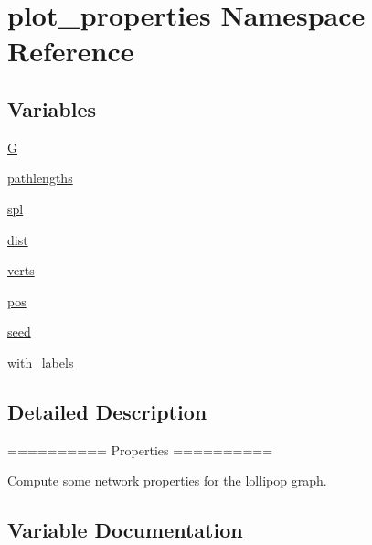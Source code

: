\hypertarget{namespaceplot__properties}{}\section{plot\+\_\+properties Namespace Reference}
\label{namespaceplot__properties}
\subsection*{Variables}
\begin{DoxyCompactItemize}
\item 
\hyperlink{namespaceplot__properties_aa256caf2d44a0c0359cd726ec541198d}{G}
\item 
\hyperlink{namespaceplot__properties_a38087a53babc65e2d5bd6f95163c136a}{pathlengths}
\item 
\hyperlink{namespaceplot__properties_a8c0a474ab2e046e3a80293bdc532b27b}{spl}
\item 
\hyperlink{namespaceplot__properties_a01fd26cdbaafe07d31960f4ef8ea7604}{dist}
\item 
\hyperlink{namespaceplot__properties_af501730ce04806586b0bd73d99ad2676}{verts}
\item 
\hyperlink{namespaceplot__properties_a2ed4f32de09985daa45f8cc0e9b01518}{pos}
\item 
\hyperlink{namespaceplot__properties_a5334fc418a515a8ecdcf39e0be2ea14c}{seed}
\item 
\hyperlink{namespaceplot__properties_a6f8852973e6121abab9080b048e9879b}{with\+\_\+labels}
\end{DoxyCompactItemize}


\subsection{Detailed Description}
\begin{DoxyVerb}==========
Properties
==========

Compute some network properties for the lollipop graph.
\end{DoxyVerb}
 

\subsection{Variable Documentation}
\mbox{\label{namespaceplot__properties_a01fd26cdbaafe07d31960f4ef8ea7604}} 
